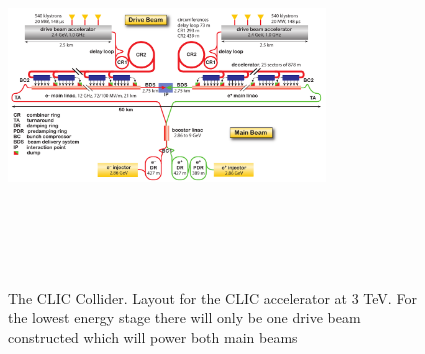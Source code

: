 \begin{figure}
  \centering
  \includegraphics[width=0.75\textwidth,height=10cm,keepaspectratio]{Experiments/fig/CLIC-layout-3TeV}
  \caption[The CLIC Experiment]{The CLIC Collider. Layout for the CLIC accelerator at 3 TeV. For the lowest energy stage there will only be one drive beam constructed which will power both main beams\cite{CDR}}
  \label{Fig:CLIC}
\end{figure}

